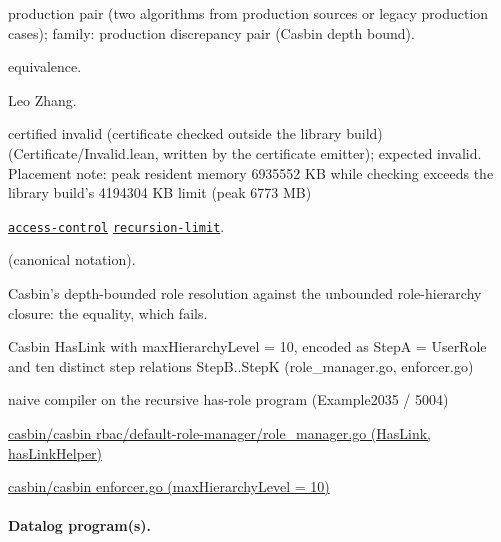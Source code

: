 \documentclass[10pt]{article}
\begin{document}
\begin{description}[leftmargin=2.6cm,style=nextline,itemsep=1pt]

\item[Category] production pair (two algorithms from production sources or legacy production cases); family: production discrepancy pair (Casbin depth bound).

\item[Kind] equivalence.

\item[Contributors] Leo Zhang.

\item[Status] certified invalid (certificate checked outside the library build) (Certificate/Invalid.lean, written by the certificate emitter); expected invalid. Placement note: peak resident memory 6935552 KB while checking  exceeds the library build's 4194304 KB limit (peak 6773 MB)

\item[Tags] \hyperref[tag:access-control]{\texttt{access-control}} \hyperref[tag:recursion-limit]{\texttt{recursion-limit}}.

\item[Input]  (canonical notation).

\item[Summary] Casbin's depth-bounded role resolution against the unbounded role-hierarchy closure: the equality, which fails.

\item[Sides] Casbin HasLink with maxHierarchyLevel = 10, encoded as StepA = UserRole and ten distinct step relations StepB..StepK (role\_manager.go, enforcer.go) \par naive compiler on the recursive has-role program (Example2035 / 5004)

\item[Sources] {\raggedright \href{https://github.com/casbin/casbin/blob/master/rbac/default-role-manager/role_manager.go}{casbin/casbin rbac/default-role-manager/role\_manager.go (HasLink, hasLinkHelper)} \par \href{https://github.com/casbin/casbin/blob/master/enforcer.go}{casbin/casbin enforcer.go (maxHierarchyLevel = 10)}\par}

\end{description}

\paragraph{Datalog program(s).}
\end{document}

